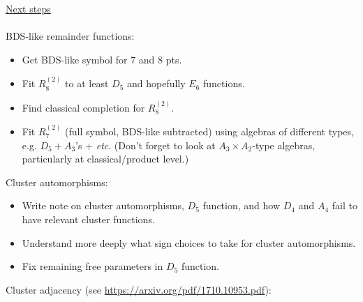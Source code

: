 \documentclass[12pt]{article}
\begin{document}
\underline{Next steps}\\ \\
BDS-like remainder functions:
\begin{itemize}
	\item Get BDS-like symbol for 7 and 8 pts.

	\item Fit $R^{(2)}_8$ to at least $D_5$ and hopefully $E_6$ functions.

	\item Find classical completion for $R^{(2)}_8$.

	\item Fit $R^{(2)}_7$ (full symbol, BDS-like subtracted) using algebras of different types, e.g. $D_5 + A_3$'s + \emph{etc}. (Don't forget to look at $A_3\times A_2$-type algebras, particularly at classical/product level.)\\
\end{itemize}
Cluster automorphisms:
\begin{itemize}
	\item Write note on cluster automorphisms, $D_5$ function, and how $D_4$ and $A_4$ fail to have relevant cluster functions.

	\item Understand more deeply what sign choices to take for cluster automorphisms.

	\item Fix remaining free parameters in $D_5$ function.\\
\end{itemize}
Cluster adjacency (see \url{https://arxiv.org/pdf/1710.10953.pdf}):
\end{document}
